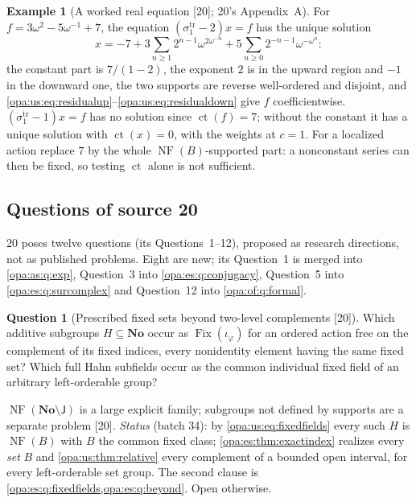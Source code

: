 \documentclass[11pt,oneside]{article}
\numberwithin{equation}{section}
\theoremstyle{definition}
\newtheorem{example}[example]{Example}
\newtheorem{question}[question]{Question}
\theoremstyle{remark}
\newcommand{\No}{\mathbf{No}}
\newcommand{\ct}{\operatorname{ct}}
\newcommand{\Fix}{\operatorname{Fix}}
\newcommand{\src}[1]{\textup{\textsf{\small[#1]}}}
\newcommand{\NF}{\operatorname{NF}}
\begin{document}
\begin{example}[A worked real equation \src{20}; 20's Appendix~A]\label{opa:us:ex:worked}
For $f=3\omega^2-5\omega^{-1}+7$, the equation $(\sigma^{\mathrm{tr}}_1-2)x=f$ has the unique solution
\begin{equation}\label{opa:us:eq:worked}
 x=-7+3\sum_{n\ge1}2^{n-1}\omega^{2\omega^{-n}}+5\sum_{n\ge0}2^{-n-1}\omega^{-\omega^n}:
\end{equation}
the constant part is $7/(1-2)$, the exponent $2$ is in the upward region and $-1$ in the downward one, the two supports are reverse well-ordered and
disjoint, and \eqref{opa:us:eq:residualup}--\eqref{opa:us:eq:residualdown} give $f$ coefficientwise. $(\sigma^{\mathrm{tr}}_1-1)x=f$ has no solution since
$\ct(f)=7$; without the constant it has a unique solution with $\ct(x)=0$, with the weights at $c=1$. For a localized action replace $7$ by the whole
$\NF(B)$-supported part: a nonconstant series can then be fixed, so testing $\ct$ alone is not sufficient.
\end{example}

\subsection{Questions of source 20}\label{opa:us:sub:questions}

20 poses twelve questions (its Questions~1--12), proposed as research directions, not as published problems. Eight are new; its Question~1 is merged into
\cref{opa:as:q:exp}, Question~3 into \cref{opa:es:q:conjugacy}, Question~5 into \cref{opa:es:q:surcomplex} and Question~12 into \cref{opa:of:q:formal}.

\begin{question}[Prescribed fixed sets beyond two-level complements \src{20}]\label{opa:us:q:fixedsets}
Which additive subgroups $H\subseteq\No$ occur as $\Fix(\iota_\varphi)$ for an ordered action free on the complement of its fixed indices, every
nonidentity element having the same fixed set? Which full Hahn subfields occur as the common individual fixed field of an arbitrary left-orderable
group?
\end{question}
$\NF(\No\setminus\mathsf J)$ is a large explicit family; subgroups not defined by supports are a separate problem \src{20}. \emph{Status} (batch 34):
by \eqref{opa:us:eq:fixedfields} every such $H$ is $\NF(B)$ with $B$ the common fixed class; \cref{opa:es:thm:exactindex} realizes every \emph{set}
$B$ and \cref{opa:us:thm:relative} every complement of a bounded open interval, for every left-orderable set group. The second clause is
\cref{opa:es:q:fixedfields,opa:es:q:beyond}. Open otherwise.
\end{document}
